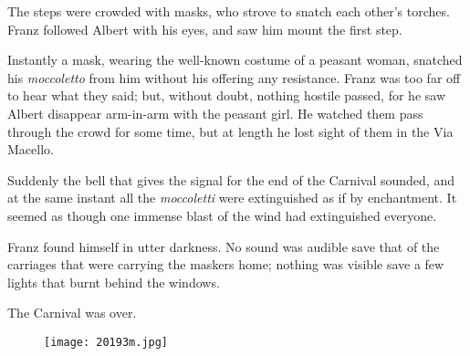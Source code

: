 The steps were crowded with masks, who strove to snatch each other’s
torches. Franz followed Albert with his eyes, and saw him mount the
first step.

Instantly a mask, wearing the well-known costume of a peasant woman,
snatched his \textit{moccoletto} from him without his offering any resistance.
Franz was too far off to hear what they said; but, without doubt,
nothing hostile passed, for he saw Albert disappear arm-in-arm with the
peasant girl. He watched them pass through the crowd for some time, but
at length he lost sight of them in the Via Macello.

Suddenly the bell that gives the signal for the end of the Carnival
sounded, and at the same instant all the \textit{moccoletti} were extinguished
as if by enchantment. It seemed as though one immense blast of the wind
had extinguished everyone.

Franz found himself in utter darkness. No sound was audible save that
of the carriages that were carrying the maskers home; nothing was
visible save a few lights that burnt behind the windows.

The Carnival was over.

\begin{figure}[ht]
\texttt{[image: 20193m.jpg]}
\end{figure}
